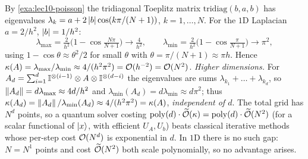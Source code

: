 \begin{solution}
By \cref{exa:lec10-poisson} the tridiagonal Toeplitz matrix $\mathrm{tridiag}(b,a,b)$ has
eigenvalues $\lambda_k=a+2\left\lvert b \right\rvert\cos(k\pi/(N+1))$, $k=1,\dots,N$. For the $1$D Laplacian
$a=2/h^2$, $\left\lvert b \right\rvert=1/h^2$:
\[
  \lambda_{\max}=\tfrac2{h^2}\bigl(1-\cos\tfrac{N\pi}{N+1}\bigr)\to\tfrac4{h^2},\qquad
  \lambda_{\min}=\tfrac2{h^2}\bigl(1-\cos\tfrac{\pi}{N+1}\bigr)\to\pi^2,
\]
using $1-\cos\theta\approx\theta^2/2$ for small $\theta$ with $\theta=\pi/(N+1)\approx\pi
h$. Hence $\kappa(A)=\lambda_{\max}/\lambda_{\min}\approx4/(h^2\pi^2)=\mathcal{O}(h^{-2})
=\mathcal{O}(N^2)$. \emph{Higher dimensions.} For $A_d=\sum_{i=1}^d\mathbb{I}^{\otimes(i-1)}\otimes A
\otimes\mathbb{I}^{\otimes(d-i)}$ the eigenvalues are sums $\lambda_{k_1}+\dots+\lambda_{k_d}$,
so $\left\lVert A_d \right\rVert=d\lambda_{\max}\approx4d/h^2$ and $\lambda_{\min}(A_d)=d\lambda_{\min}
\approx d\pi^2$; thus $\kappa(A_d)=\left\lVert A_d \right\rVert/\lambda_{\min}(A_d)\approx4/(h^2\pi^2)
=\kappa(A)$, \emph{independent of $d$}. The total grid has $N^d$ points, so a quantum
solver costing $\operatorname{poly}(d)\cdot\widetilde{\mathcal{O}}(\kappa)=\operatorname{poly}(d)\cdot\widetilde{\mathcal{O}}
(N^2)$ (for a scalar functional of $\ket x$, with efficient $U_A,U_b$) beats classical
iterative methods whose per-step cost $\mathcal{O}(N^d)$ is exponential in $d$. In $1$D there
is no such gap: $N=N^1$ points and cost $\widetilde{\mathcal{O}}(N^2)$ both scale
polynomially, so no advantage arises.
\end{solution}

